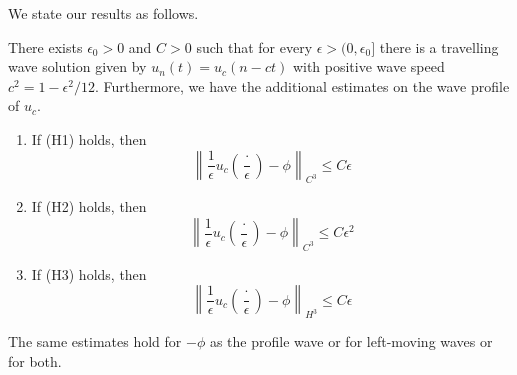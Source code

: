 We state our results as follows.
\begin{theorem}
	There exists \(\epsilon_0> 0\) and \(C> 0\) such that for every \(\epsilon > (0,\epsilon_0]\) there is a travelling wave solution given by \(u_n(t) = u_c(n-ct)\) with positive wave speed \(c^2 = 1 - \epsilon^2/12\). Furthermore, we have the additional estimates on the wave profile of \(u_c\).
	\begin{enumerate}[label = (\roman*)]
		\item If (H1) holds, then
		\begin{equation}
			\left\| \frac 1 \epsilon u_c\left(\frac \cdot \epsilon \right) - \phi \right\|_{C^3} \leq C \epsilon
		\end{equation}
		\item If (H2) holds, then
		\begin{equation}
			\left\| \frac 1 \epsilon u_c\left(\frac \cdot \epsilon \right) - \phi \right\|_{C^3} \leq C \epsilon^2
		\end{equation}
		\item If (H3) holds, then
		\begin{equation}
			\left\| \frac 1 \epsilon u_c\left(\frac \cdot \epsilon \right) - \phi \right\|_{H^3} \leq C \epsilon
		\end{equation}
	\end{enumerate}
\end{theorem}
The same estimates hold for \(-\phi\) as the profile wave or for left-moving waves or for both.